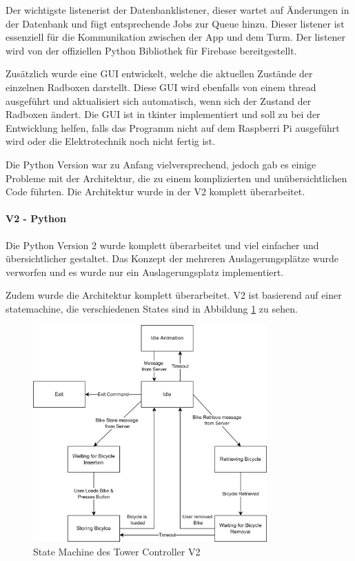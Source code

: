 Der wichtigste \Gls{listener}ist der Datenbanklistener, dieser wartet auf Änderungen in der Datenbank und fügt entsprechende Jobs zur Queue hinzu. Dieser \Gls{listener} ist essenziell für die Kommunikation zwischen der App und dem Turm. Der \Gls{listener} wird von der offiziellen Python Bibliothek für Firebase bereitgestellt.

Zusätzlich wurde eine \ac{GUI} entwickelt, welche die aktuellen Zustände der einzelnen Radboxen darstellt. Diese \ac{GUI} wird ebenfalls von einem \Gls{thread} ausgeführt und aktualisiert sich automatisch, wenn sich der Zustand der Radboxen ändert. Die \ac{GUI} ist in tkinter implementiert und soll zu bei der Entwicklung helfen, falls das Programm nicht auf dem Raspberri Pi ausgeführt wird oder die Elektrotechnik noch nicht fertig ist.

Die Python Version war zu Anfang vielversprechend, jedoch gab es einige Probleme mit der Architektur, die zu einem komplizierten und unübersichtlichen Code führten. Die Architektur wurde in der V2 komplett überarbeitet.


\paragraph{V2 - Python}
Die Python Version 2 wurde komplett überarbeitet und viel einfacher und übersichtlicher gestaltet. Das Konzept der mehreren Auslagerungsplätze wurde verworfen und es wurde nur ein Auslagerungsplatz implementiert.

Zudem wurde die Architektur komplett überarbeitet. V2 ist basierend auf einer \Gls{statemachine}, die verschiedenen States sind in Abbildung \ref{fig:tower_controller_v1_state_machine} zu sehen.

\begin{figure}
  \centering
  \includegraphics[width=0.8\textwidth]{images/tower_controller_v2_state_machine.png}
  \caption{State Machine des Tower Controller V2}
  \label{fig:tower_controller_v1_state_machine}
\end{figure}

